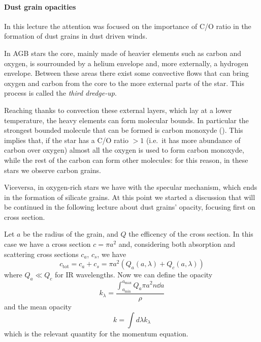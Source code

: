 \documentclass[main.tex]{subfiles}
\begin{document}
\paragraph{Dust grain opacities}

In this lecture the attention was focused on the importance of C/O ratio in the formation of dust grains in dust driven winds. 

In AGB stars the core, mainly made of heavier elements such as carbon and oxygen, is sourrounded by a helium envelope and, more externally, a hydrogen envelope. 
Between these areas there exist some convective flows that can bring oxygen and carbon from the core to the more external parts of the star. 
This process is called the \emph{third dredge-up}.

Reaching thanks to convection these external layers, which lay at a lower temperature, the heavy elements can form molecular bounds.
In particular the strongest bounded molecule that can be formed is carbon monoxyde ().
This implies that, if the star has a C/O ratio $>1$ (i.e.\ it has more abundance of carbon over oxygen) almost all the oxygen is used to form carbon monoxyde, while the rest of the carbon can form other molecules: for this reason, in these stars we observe carbon grains.

Viceversa, in oxygen-rich stars we have with the specular mechanism, which ends in the formation of silicate grains.
At this point we started a discussion that will be continued in the following lecture about dust grains' opacity, focusing first on cross section.

Let $a$ be the radius of the grain, and $Q$ the efficency of the cross section. In this case we have a cross section $c=\pi a^2$ and, considering both absorption and scattering cross sections $c_a$, $c_s$, we have
%
\begin{equation}
c_{\text{tot}}
=c_a+c_s
=\pi a^2(Q_a(a,\lambda)+Q_c(a,\lambda))
\end{equation}
%
where $Q_a \ll Q_c$ for IR wavelengths.
Now we can define the opacity
%
\begin{equation}
k_\lambda=\frac{\int_{a_{\text{min}}}^{a_{\text{max}}}Q_a\pi a^2 n \dd{a}}{\rho}
\end{equation}
%
and the mean opacity
%
\begin{equation}
k=\int d\lambda k_\lambda
\end{equation}
%
which is the relevant quantity for the momentum equation.
\end{document}
